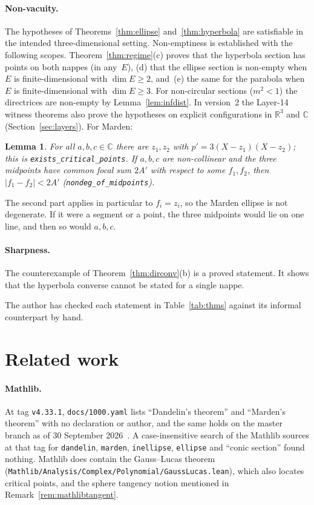 \documentclass[11pt]{article}
\newtheorem{lemma}[theorem]{Lemma}
\theoremstyle{remark}
\newcommand{\lean}[1]{\texttt{#1}}
\newcommand{\R}{\mathbb{R}}
\newcommand{\C}{\mathbb{C}}
\begin{document}
\paragraph{Non-vacuity.} The hypotheses of Theorems~\ref{thm:ellipse} and~\ref{thm:hyperbola}
are satisfiable in the intended three-dimensional setting. Non-emptiness is established with the following scopes. Theorem~\ref{thm:regime}(c) proves that the
hyperbola section has points on both nappes (in any~$E$), (d) that the ellipse section is
non-empty when $E$ is finite-dimensional with $\dim E\ge2$, and~(e) the same for the parabola
when $E$ is finite-dimensional with $\dim E\ge3$. For non-circular sections ($m^2<1$) the
directrices are non-empty by Lemma~\ref{lem:infdist}. In version~2 the Layer-14 witness theorems
also prove the hypotheses on explicit configurations in $\R^3$ and $\C$ (Section~\ref{sec:layers}). For Marden:

\begin{lemma}\label{lem:mardennonvac}
For all $a,b,c\in\C$ there are $z_1,z_2$ with $p'=3(X-z_1)(X-z_2)$; this is
\lean{exists\_critical\_points}. If $a,b,c$ are non-collinear and the three midpoints have
common focal sum $2A'$ with respect to some $f_1,f_2$, then $|f_1-f_2|<2A'$
(\lean{nondeg\_of\_midpoints}).
\end{lemma}

The second part applies in particular to $f_i=z_i$, so the Marden ellipse is not degenerate. If it
were a segment or a point, the three midpoints would lie on one line, and then so would $a,b,c$.

\paragraph{Sharpness.} The counterexample of Theorem~\ref{thm:dirconv}(b) is a proved statement.
It shows that the hyperbola converse cannot be stated for a single nappe.

The author has checked each statement in Table~\ref{tab:thms} against its informal counterpart by hand.

\section{Related work}\label{sec:related}

\paragraph{Mathlib.} At tag \texttt{v4.33.1}, \texttt{docs/1000.yaml} lists ``Dandelin's theorem''
and ``Marden's theorem'' with no declaration or author, and the same holds on the master branch as
of 30 September 2026~\cite{Mathlib1000}. A case-insensitive search of the Mathlib sources at that
tag for \texttt{dandelin}, \texttt{marden}, \texttt{inellipse}, \texttt{ellipse} and ``conic
section'' found nothing. Mathlib does contain the Gauss--Lucas theorem
(\texttt{Mathlib/Analysis/Complex/Polynomial/GaussLucas.lean}), which also locates critical
points, and the sphere tangency notion mentioned in Remark~\ref{rem:mathlibtangent}.
\end{document}
